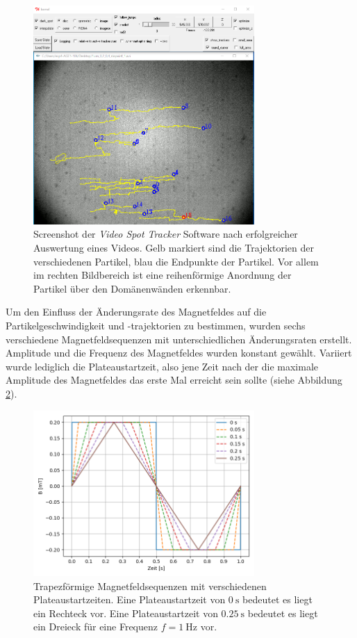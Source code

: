 \documentclass[page,pdftex,12pt,a4paper,twoside,openright]{scrbook}
\begin{document}
\begin{figure}[h]
\centering
\includegraphics[width=0.75\textwidth]{./img/videospottracker.png}
\caption{\label{fig-videospottracker}
Screenshot der \emph{Video Spot Tracker} Software nach erfolgreicher Auswertung eines Videos. Gelb markiert sind die Trajektorien der verschiedenen Partikel, blau die Endpunkte der Partikel. Vor allem im rechten Bildbereich ist eine reihenförmige Anordnung der Partikel über den Domänenwänden erkennbar.}
\end{figure}

Um den Einfluss der Änderungsrate des Magnetfeldes auf die Partikelgeschwindigkeit und -trajektorien zu bestimmen, wurden sechs verschiedene Magnetfeldsequenzen mit unterschiedlichen Änderungsraten erstellt. Amplitude und die Frequenz des Magnetfeldes wurden konstant gewählt. Variiert wurde lediglich die Plateaustartzeit, also jene Zeit nach der die maximale Amplitude des Magnetfeldes das erste Mal erreicht sein sollte (siehe Abbildung \ref{fig-plateau}).

\begin{figure}[h]
\centering
\includegraphics[width=0.75\textwidth]{./img/plateau.png}
\caption{\label{fig-plateau}
Trapezförmige Magnetfeldsequenzen mit verschiedenen Plateaustartzeiten. Eine Plateaustartzeit von \(\SI{0}{\s}\) bedeutet es liegt ein Rechteck vor. Eine Plateaustartzeit von \(\SI{0.25}{\s}\) bedeutet es liegt ein Dreieck für eine Frequenz \(f = \SI{1}{\hertz}\) vor.}
\end{figure}
\end{document}
